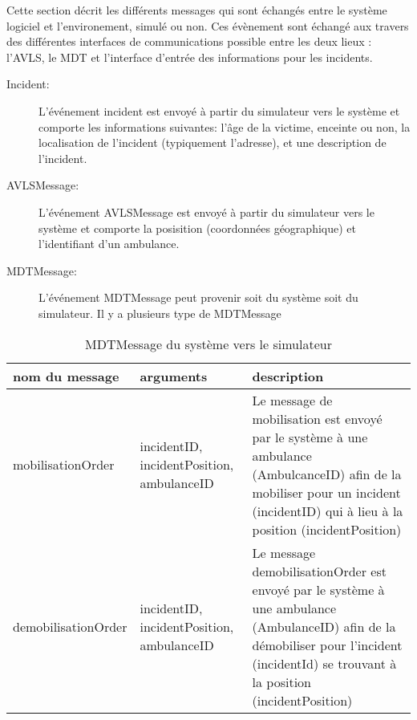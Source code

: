 Cette section décrit les différents messages qui sont échangés entre le
système logiciel et l'environement, simulé ou non. Ces évènement sont échangé
aux travers des différentes interfaces de communications possible entre 
les deux lieux : l'AVLS, le MDT et l'interface d'entrée des informations
pour les incidents.

\begin{description}
	\item [Incident:] L'événement incident est envoyé à partir du simulateur vers le système et comporte les informations suivantes: 		
	l'âge de la victime, enceinte ou non, la localisation de l'incident (typiquement l'adresse), et une description de l'incident.
	\item [AVLSMessage:]L'événement AVLSMessage est envoyé à partir du simulateur vers le système et comporte la posisition (coordonnées 					géographique) et l'identifiant d'un ambulance.
	\item [MDTMessage:] L'événement MDTMessage peut provenir soit du système soit du simulateur. Il y a plusieurs type de MDTMessage
\end{description}	


\begin{table}[!h]
	\centering
	\begin{tabularx}{\marginparsep+\marginparwidth+\marginparpush+\textwidth}{|l|X|X|}
		\hline
		\textbf{nom du message} & \textbf{arguments} & \textbf{description} \\ \hline
		mobilisationOrder & incidentID, incidentPosition, ambulanceID & Le message de mobilisation est envoyé par le système à une ambulance (AmbulcanceID) afin de la mobiliser pour un incident (incidentID) qui à lieu à la position (incidentPosition) \\ \hline
		demobilisationOrder & incidentID, incidentPosition, ambulanceID & Le message demobilisationOrder est envoyé par le système à une ambulance (AmbulanceID) afin de la démobiliser pour l'incident (incidentId) se trouvant à la position (incidentPosition) \\ \hline
	\end{tabularx} 
	\caption{MDTMessage du système vers le simulateur}
	\label{tab:MDTMessage}
\end{table}

